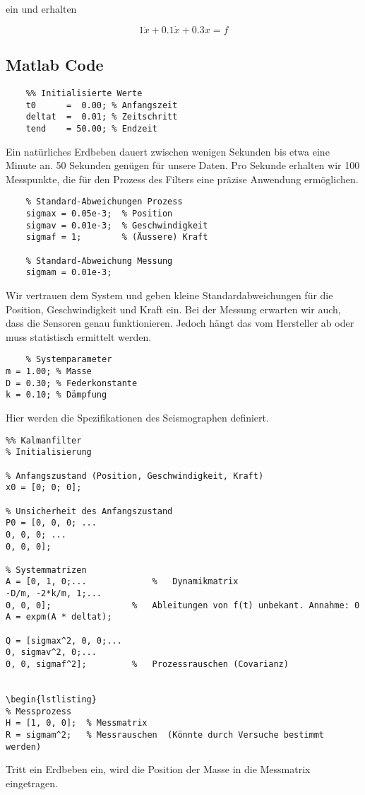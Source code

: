 ein und erhalten

\begin{equation}
	1\ddot x + 0.1 \dot x + 0.3x = f	
\end{equation} 

\subsection{Matlab Code}


\begin{lstlisting}
	%% Initialisierte Werte
	t0      =  0.00; % Anfangszeit
	deltat  =  0.01; % Zeitschritt
	tend    = 50.00; % Endzeit
\end{lstlisting}
Ein natürliches Erdbeben dauert zwischen wenigen Sekunden bis etwa eine Minute an.
50 Sekunden genügen für unsere Daten. 
Pro Sekunde erhalten wir 100 Messpunkte, die für den Prozess des Filters eine präzise Anwendung ermöglichen.

\begin{lstlisting}
	% Standard-Abweichungen Prozess
	sigmax = 0.05e-3;  % Position
	sigmav = 0.01e-3;  % Geschwindigkeit
	sigmaf = 1;        % (Äussere) Kraft
	
	% Standard-Abweichung Messung
	sigmam = 0.01e-3;
\end{lstlisting}

Wir vertrauen dem System und geben kleine Standardabweichungen für die Position, Geschwindigkeit und Kraft ein.
Bei der Messung erwarten wir auch, dass die Sensoren genau funktionieren.
Jedoch hängt das vom Hersteller ab oder muss statistisch ermittelt werden.


\begin{lstlisting}
	% Systemparameter
m = 1.00; % Masse
D = 0.30; % Federkonstante
k = 0.10; % Dämpfung
\end{lstlisting}
Hier werden die Spezifikationen des Seismographen definiert.

\begin{lstlisting}
%% Kalmanfilter
% Initialisierung

% Anfangszustand (Position, Geschwindigkeit, Kraft)
x0 = [0; 0; 0];

% Unsicherheit des Anfangszustand
P0 = [0, 0, 0; ...
0, 0, 0; ...
0, 0, 0];

% Systemmatrizen
A = [0, 1, 0;...             %   Dynamikmatrix
-D/m, -2*k/m, 1;...      
0, 0, 0];                %   Ableitungen von f(t) unbekant. Annahme: 0
A = expm(A * deltat);

Q = [sigmax^2, 0, 0;...      
0, sigmav^2, 0;...
0, 0, sigmaf^2];         %   Prozessrauschen (Covarianz)


\begin{lstlisting}
% Messprozess
H = [1, 0, 0];  % Messmatrix
R = sigmam^2;   % Messrauschen  (Könnte durch Versuche bestimmt werden)
\end{lstlisting}
Tritt ein Erdbeben ein, wird die Position der Masse in die Messmatrix eingetragen.


